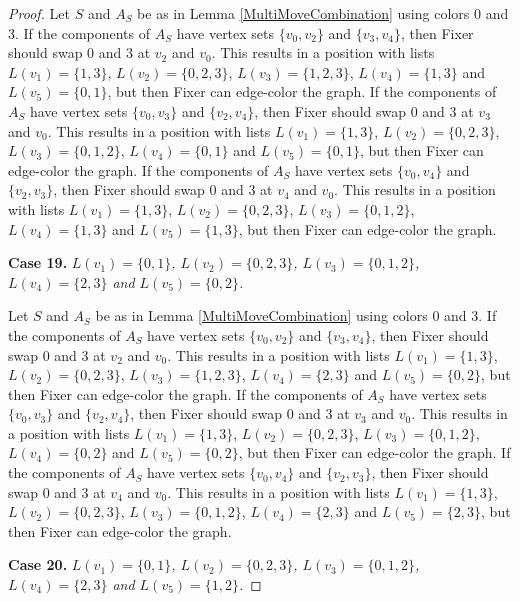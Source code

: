 \documentclass[12pt]{amsart}
\theoremstyle{plain}
\theoremstyle{definition}
\theoremstyle{remark}
\begin{document}
\begin{proof}
Let $S$ and $A_S$ be as in Lemma \ref{MultiMoveCombination} using colors $0$ and $3$. If the components of $A_S$ have vertex sets $\{v_0, v_2\}$ and $\{v_3, v_4\}$, then Fixer should swap 0 and 3 at $v_2$ and $v_0$. This results in a position with lists $L(v_1) = \{1, 3\}$, $L(v_2) = \{0, 2, 3\}$, $L(v_3) = \{1, 2, 3\}$, $L(v_4) = \{1, 3\}$ and $L(v_5) = \{0, 1\}$, but then Fixer can edge-color the graph.
If the components of $A_S$ have vertex sets $\{v_0, v_3\}$ and $\{v_2, v_4\}$, then Fixer should swap 0 and 3 at $v_3$ and $v_0$. This results in a position with lists $L(v_1) = \{1, 3\}$, $L(v_2) = \{0, 2, 3\}$, $L(v_3) = \{0, 1, 2\}$, $L(v_4) = \{0, 1\}$ and $L(v_5) = \{0, 1\}$, but then Fixer can edge-color the graph.
If the components of $A_S$ have vertex sets $\{v_0, v_4\}$ and $\{v_2, v_3\}$, then Fixer should swap 0 and 3 at $v_4$ and $v_0$. This results in a position with lists $L(v_1) = \{1, 3\}$, $L(v_2) = \{0, 2, 3\}$, $L(v_3) = \{0, 1, 2\}$, $L(v_4) = \{1, 3\}$ and $L(v_5) = \{1, 3\}$, but then Fixer can edge-color the graph.

\noindent\textbf{Case 19.  }\textit{$L(v_1) = \{0, 1\}$, $L(v_2) = \{0, 2, 3\}$, $L(v_3) = \{0, 1, 2\}$, $L(v_4) = \{2, 3\}$ and $L(v_5) = \{0, 2\}$.}

Let $S$ and $A_S$ be as in Lemma \ref{MultiMoveCombination} using colors $0$ and $3$. If the components of $A_S$ have vertex sets $\{v_0, v_2\}$ and $\{v_3, v_4\}$, then Fixer should swap 0 and 3 at $v_2$ and $v_0$. This results in a position with lists $L(v_1) = \{1, 3\}$, $L(v_2) = \{0, 2, 3\}$, $L(v_3) = \{1, 2, 3\}$, $L(v_4) = \{2, 3\}$ and $L(v_5) = \{0, 2\}$, but then Fixer can edge-color the graph.
If the components of $A_S$ have vertex sets $\{v_0, v_3\}$ and $\{v_2, v_4\}$, then Fixer should swap 0 and 3 at $v_3$ and $v_0$. This results in a position with lists $L(v_1) = \{1, 3\}$, $L(v_2) = \{0, 2, 3\}$, $L(v_3) = \{0, 1, 2\}$, $L(v_4) = \{0, 2\}$ and $L(v_5) = \{0, 2\}$, but then Fixer can edge-color the graph.
If the components of $A_S$ have vertex sets $\{v_0, v_4\}$ and $\{v_2, v_3\}$, then Fixer should swap 0 and 3 at $v_4$ and $v_0$. This results in a position with lists $L(v_1) = \{1, 3\}$, $L(v_2) = \{0, 2, 3\}$, $L(v_3) = \{0, 1, 2\}$, $L(v_4) = \{2, 3\}$ and $L(v_5) = \{2, 3\}$, but then Fixer can edge-color the graph.

\noindent\textbf{Case 20.  }\textit{$L(v_1) = \{0, 1\}$, $L(v_2) = \{0, 2, 3\}$, $L(v_3) = \{0, 1, 2\}$, $L(v_4) = \{2, 3\}$ and $L(v_5) = \{1, 2\}$.}


\end{proof}
\end{document}
